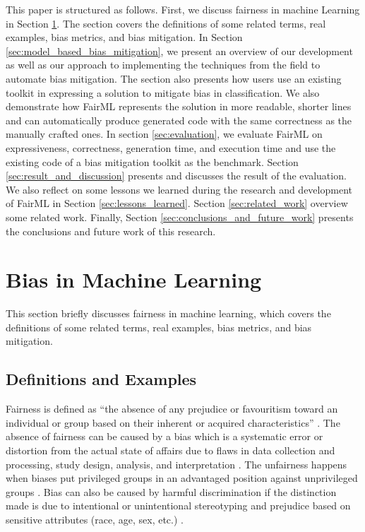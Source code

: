 \documentclass[sigconf,review]{acmart}
\begin{document}
	This paper is structured as follows. First, we discuss fairness in machine Learning in Section \ref{sec:bias_in_machine_learning}. The section covers the definitions of some related terms, real examples, bias metrics, and bias mitigation. In Section \ref{sec:model_based_bias_mitigation}, we present an overview of our development as well as our approach to implementing the techniques from the field to automate bias mitigation. 
	The section also presents how users use an existing toolkit in expressing a solution to mitigate bias in classification. We also demonstrate how FairML represents the solution in more readable, shorter lines and can automatically produce generated code with the same correctness as the manually crafted ones.
	In section \ref{sec:evaluation}, we evaluate FairML on expressiveness, correctness, generation time, and execution time and use the existing code of a bias mitigation toolkit as the benchmark. Section \ref{sec:result_and_discussion} presents and discusses the result of the evaluation. 
	We also reflect on some lessons we learned during the research and development of FairML in Section \ref{sec:lessons_learned}. 
	Section \ref{sec:related_work} overview some related work. 
	Finally, Section \ref{sec:conclusions_and_future_work} presents the conclusions and future work of this research.
	
	\section{Bias in Machine Learning}
	\label{sec:bias_in_machine_learning}
	This section briefly discusses fairness in machine learning, which covers the definitions of some related terms, real examples, bias metrics, and bias mitigation.
	
	\subsection{Definitions and Examples}
	\label{sec:definitions_and_examples}
	
	Fairness is defined as ``the absence of any prejudice or favouritism toward an individual or
	group based on their inherent or acquired characteristics'' \cite{mehrabi2021survey}.
	The absence of fairness can be caused by a bias which is a systematic error or distortion from the actual state of affairs due to flaws in data collection and processing, study design, analysis, and interpretation \cite{oxford2022bias}. 
	The unfairness happens when biases put privileged groups in an advantaged position against unprivileged groups \cite{bellamy2018ai}. 
	Bias can also be caused by harmful discrimination if the distinction made is due to intentional or unintentional stereotyping and prejudice based on sensitive attributes (race, age, sex, etc.) \cite{mehrabi2021survey,chen2019fairness}. 
	
\end{document}
